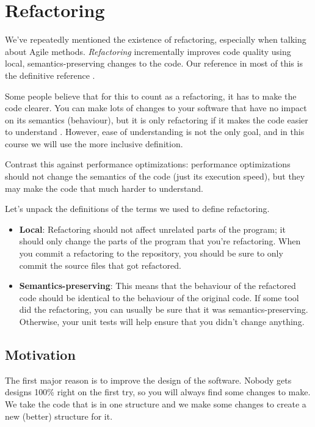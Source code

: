





\section*{Refactoring}
We've repeatedly mentioned the existence of refactoring, especially
when talking about Agile methods. \emph{Refactoring} incrementally
improves code quality using local, semantics-preserving changes to the
code. Our reference in most of this is the definitive reference \cite{fowler}.

Some people believe that for this to count as a refactoring, it has to make the code clearer. You can make lots of changes to your software that have no impact on its semantics (behaviour), but it is only refactoring if it makes the code easier to understand \cite{sourcemaking}. However, ease of understanding is not the only goal, and in this course we will use the more inclusive definition.

Contrast this against performance optimizations: performance optimizations should not change the semantics of the code (just its execution speed), but they may make the code that much harder to understand.

Let's unpack the definitions of the terms we used to define refactoring.

\begin{itemize}
\item {\bf Local}: Refactoring should not affect unrelated parts of the
program; it should only change the parts of the program that you're 
refactoring. When you commit a refactoring to the repository,
you should be sure to only commit the source files that got refactored.
\item {\bf Semantics-preserving}: This means that the behaviour
of the refactored code should be identical to the behaviour of the
original code. If some tool did the refactoring, you can usually be sure
that it was semantics-preserving. Otherwise, your unit tests will help
ensure that you didn't change anything.
\end{itemize}

\subsection*{Motivation}

The first major reason is to improve the design of the software. Nobody gets designs 100\% right on the first try, so you will always find some changes to make. We take the code that is in one structure and we make some changes to create a new (better) structure for it. 

